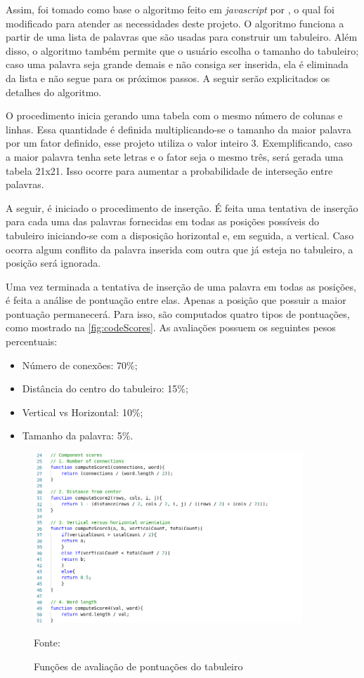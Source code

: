 Assim, foi tomado como base o algoritmo feito em \textit{javascript} por \cite{layoutGenerator}, o qual foi modificado para atender as necessidades deste projeto. O algoritmo funciona a partir de uma lista de palavras que são usadas para construir um tabuleiro. Além disso, o algoritmo também permite que o usuário escolha o tamanho do tabuleiro; caso uma palavra seja grande demais e não consiga ser inserida, ela é eliminada da lista e não segue para os próximos passos. A seguir serão explicitados os detalhes do algoritmo.

O procedimento inicia gerando uma tabela com o mesmo número de colunas e linhas. Essa quantidade é definida multiplicando-se o tamanho da maior palavra por um fator definido, esse projeto utiliza o valor inteiro 3. Exemplificando, caso a maior palavra tenha sete letras e o fator seja o mesmo três, será gerada uma tabela 21x21. Isso ocorre para aumentar a probabilidade de interseção entre palavras. 

A seguir, é iniciado o procedimento de inserção. É feita uma tentativa de inserção para cada uma das palavras fornecidas em todas as posições possíveis do tabuleiro iniciando-se com a disposição horizontal e, em seguida, a vertical. Caso ocorra algum conflito da palavra inserida com outra que já esteja no tabuleiro, a posição será ignorada. 

Uma vez terminada a tentativa de inserção de uma palavra em todas as posições, é feita a análise de pontuação entre elas. Apenas a posição que possuir a maior pontuação permanecerá. Para isso, são computados quatro tipos de pontuações, como mostrado na \autoref{fig:codeScores}. As avaliações possuem os seguintes pesos percentuais:

\begin{itemize}
    \item Número de conexões: 70\%;
    \item Distância do centro do tabuleiro: 15\%;
    \item Vertical vs Horizontal: 10\%;
    \item Tamanho da palavra: 5\%.
\end{itemize}

\begin{figure}[H]
\centering
    \caption{Funções de avaliação de pontuações do tabuleiro}
    \label{fig:codeScores}
    \includegraphics[width=0.9\textwidth]{Figuras/codeComponentScores.png}
    
    Fonte: \cite{layoutGenerator}
\end{figure}

